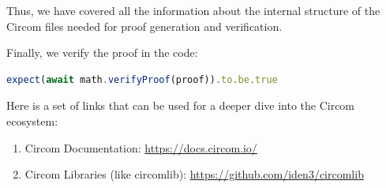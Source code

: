 \documentclass[../../book.tex]{subfiles}
\begin{document}
Thus, we have covered all the information about the internal structure of the Circom files needed for proof generation and verification.

Finally, we verify the proof in the code:
\begin{lstlisting}[language=TypeScript,numbers=none,basicstyle=\footnotesize\ttfamily\normalsize]
expect(await math.verifyProof(proof)).to.be.true
\end{lstlisting}
\begin{remark}
    \vspace{-1em}
    Here is a set of links that can be used for a deeper dive into the Circom ecosystem:
    \begin{enumerate}
        \item Circom Documentation: \url{https://docs.circom.io/}
        \item Circom Libraries (like circomlib): \url{https://github.com/iden3/circomlib}
    \end{enumerate}
\end{remark}
\end{document}
